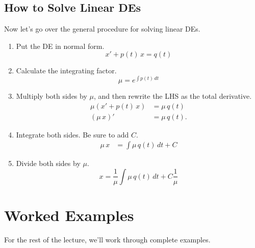 \documentclass[09pt,letterpaper]{article}
\begin{document}
\subsection{How to Solve Linear DEs}
Now let's go over the general procedure for solving linear DEs.
\begin{enumerate}
    \item Put the DE in normal form.
    $$x' + p(t)\,x =q(t)$$
    \item Calculate the integrating factor.
    $$
        \mu = e^{\int p(t) \,dt}
    $$
    \item Multiply both sides by $\mu$, and then rewrite the LHS as the total derivative.
    \begin{align*}    
    \mu (x' + p(t)\,x) &=\mu \,q(t) \\
    (\mu\,x)' &=\mu \,q(t). 
    \end{align*}
    \item Integrate both sides. Be sure to add $C$.
    \begin{align*}    
        \mu\,x &= \int \mu \,q(t)\,dt +C 
    \end{align*}
    \item Divide both sides by $\mu$. 
    $$
        x = \frac{1}{\mu}\int \mu \,q(t)\,dt +C \frac{1}{\mu} 
    $$
    
\end{enumerate}

\section{Worked Examples}
For the rest of the lecture, we'll work through complete examples.
\end{document}

